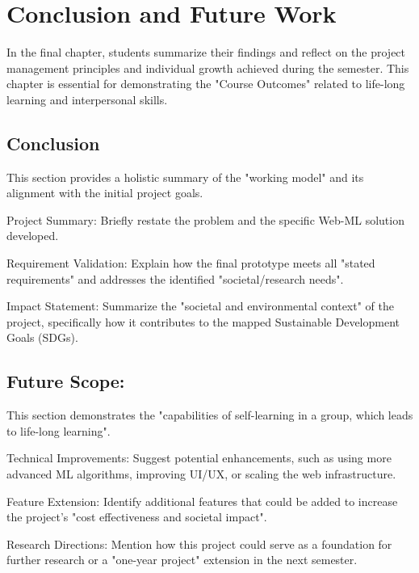 
\chapter{Conclusion and Future Work}

In the final chapter, students summarize their findings and reflect on the project management principles and individual growth achieved during the semester. This chapter is essential for demonstrating the "Course Outcomes" related to life-long learning and interpersonal skills.

\section{Conclusion}
This section provides a holistic summary of the "working model" and its alignment with the initial project goals.

Project Summary: Briefly restate the problem and the specific Web-ML solution developed.

Requirement Validation: Explain how the final prototype meets all "stated requirements" and addresses the identified "societal/research needs".

Impact Statement: Summarize the "societal and environmental context" of the project, specifically how it contributes to the mapped Sustainable Development Goals (SDGs).

\section{Future Scope:}
This section demonstrates the "capabilities of self-learning in a group, which leads to life-long learning".

Technical Improvements: Suggest potential enhancements, such as using more advanced ML algorithms, improving UI/UX, or scaling the web infrastructure.

Feature Extension: Identify additional features that could be added to increase the project's "cost effectiveness and societal impact".

Research Directions: Mention how this project could serve as a foundation for further research or a "one-year project" extension in the next semester.